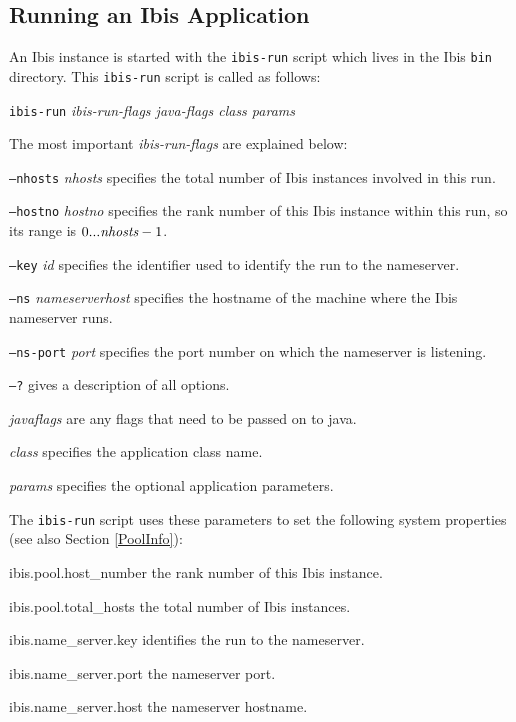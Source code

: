 \documentclass[10pt]{article}
\newcommand{\mysubsection}[1]{\subsection{#1}\label{#1}}
\begin{document}
\mysubsection{Running an Ibis Application}

An Ibis instance is started with the \texttt{ibis-run} script which
lives in the Ibis \texttt{bin} directory.  This \texttt{ibis-run}
script is called as follows:
\begin{center}
\texttt{ibis-run} \emph{ibis-run-flags java-flags class params}
\end{center}
The most important \emph{ibis-run-flags} are explained below:
\begin{description}
\item{\texttt{--nhosts} \emph{nhosts}}
specifies the total number of Ibis instances involved in this run.
\item{\texttt{--hostno} \emph{hostno}}
specifies the rank number of this Ibis instance within this run,
so its range is $0 ... \emph{nhosts}-1$.
\item{\texttt{--key} \emph{id}}
specifies the identifier used to identify the run to the nameserver.
\item{\texttt{--ns} \emph{nameserverhost}}
specifies the hostname of the machine where the Ibis nameserver runs.
\item{\texttt{--ns-port} \emph{port}}
specifies the port number on which the nameserver is listening.
\item{\texttt{--?}}
gives a description of all options.
\item{\emph{javaflags}}
are any flags that need to be passed on to java.
\item{\emph{class}}
specifies the application class name.
\item{\emph{params}}
specifies the optional application parameters.
\end{description}

The \texttt{ibis-run} script uses these parameters to set the following
system properties (see also Section \ref{PoolInfo}):
\begin{description}
\item{ibis.pool.host\_number}
the rank number of this Ibis instance.
\item{ibis.pool.total\_hosts}
the total number of Ibis instances.
\item{ibis.name\_server.key}
identifies the run to the nameserver.
\item{ibis.name\_server.port}
the nameserver port.
\item{ibis.name\_server.host}
the nameserver hostname.
\end{description}
\end{document}
